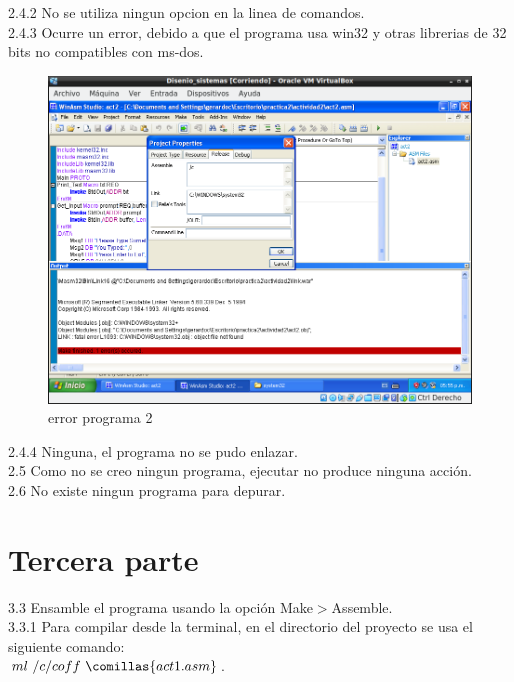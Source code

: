 \large{2.4.2} No se utiliza ningun opcion en la linea de comandos.\\

\large{2.4.3} Ocurre un error, debido a que el programa usa win32 y otras librerias de 32 bits no compatibles con ms-dos.

\begin{figure}[H]
  \includegraphics[width=\linewidth]{practica2/imagenes/ej2/ej2_2doerror.png}
  \caption{error programa 2}
\end{figure}

\large{2.4.4} Ninguna, el programa no se pudo enlazar.\\ 

\large{2.5} Como no se creo ningun programa, ejecutar no produce ninguna acción.\\ 

\large{2.6} No existe ningun programa para depurar.\\ 



\section{Tercera parte}
\large{3.3} Ensamble el programa usando la opción Make$>$Assemble.\\

\large{3.3.1} Para compilar desde la terminal, en el directorio del proyecto se usa el siguiente comando: \\
$ml \  /c /coff\  \comillas{act1.asm}$.\\

